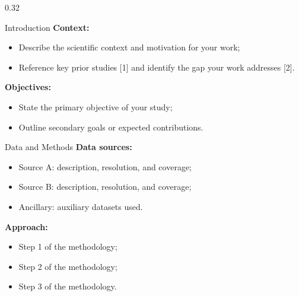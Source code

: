 \documentclass[final]{beamer}
\begin{document}
\begin{frame}{}

\maketitle

\begin{columns}[T]

  \begin{column}{0.32\linewidth}
    \begin{clsblock}{Introduction}
      \textbf{Context:}
      \begin{itemize}
        \item Describe the scientific context and motivation for your work;
        \item Reference key prior studies [1] and identify the gap
              your work addresses [2].
      \end{itemize}

      \textbf{Objectives:}
      \begin{itemize}
        \item State the primary objective of your study;
        \item Outline secondary goals or expected contributions.
      \end{itemize}
    \end{clsblock}

    \vspace{0.4cm}

    \begin{clsblock}{Data and Methods}
      \textbf{Data sources:}
      \begin{itemize}
        \item Source A: description, resolution, and coverage;
        \item Source B: description, resolution, and coverage;
        \item Ancillary: auxiliary datasets used.
      \end{itemize}

      \textbf{Approach:}
      \begin{itemize}
        \item Step 1 of the methodology;
        \item Step 2 of the methodology;
        \item Step 3 of the methodology.
      \end{itemize}


\end{clsblock}
\end{column}
\end{columns}
\end{frame}
\end{document}
